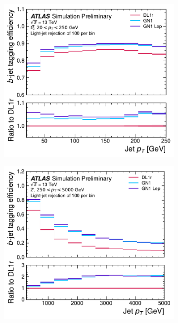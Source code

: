 \begin{figure}[!htbp]
    \centering
    \begin{subfigure}[b]{0.48\textwidth}
        \centering
        \includegraphics[width=\textwidth]{chapters/gnn_tagger/figs/results/main/ttbar/ttbar_flat_leff_by_pt_btag.pdf}
    \end{subfigure}
    \quad
    \begin{subfigure}[b]{0.48\textwidth}
        \centering
        \includegraphics[width=\textwidth]{chapters/gnn_tagger/figs/results/main/zprime/zprime_flat_leff_by_pt_btag.pdf}

\end{subfigure}
\end{figure}
